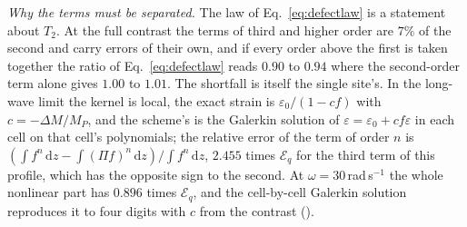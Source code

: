 \documentclass[11pt,a4paper]{article}
\newcommand{\dd}{\mathrm{d}}
\begin{document}
\emph{Why the terms must be separated.} The law of Eq.~\eqref{eq:defectlaw} is a statement about $T_2$. At the full contrast
the terms of third and higher order are $7\%$ of the second and carry errors of their own, and if every
order above the first is taken together the ratio of Eq.~\eqref{eq:defectlaw} reads $0.90$ to $0.94$
where the second-order term alone gives $1.00$ to $1.01$. The shortfall is itself the single site's. In
the long-wave limit the kernel is local, the exact strain is $\varepsilon_0/(1-cf)$ with
$c=-\Delta M/M_P$, and the scheme's is the Galerkin solution of $\varepsilon=\varepsilon_0+cf\varepsilon$
in each cell on that cell's polynomials; the relative error of the term of order $n$ is
$(\int f^n\,\dd z-\int(\Pi f)^n\,\dd z)/\int f^n\,\dd z$, $2.455$ times $\mathcal{E}_q$ for the third term of this profile,
which has the opposite sign to the second. At $\omega=30$\,rad\,s$^{-1}$ the whole nonlinear part has
$0.896$ times $\mathcal{E}_q$, and the cell-by-cell Galerkin solution reproduces it to four digits with
$c$ from the contrast ().
\end{document}
